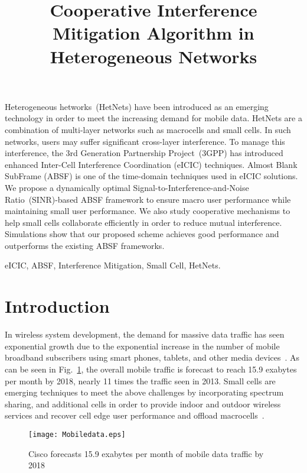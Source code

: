 \documentclass[paper]{ieice}
\title{Cooperative Interference Mitigation Algorithm in Heterogeneous Networks}
\begin{document}
\maketitle
\begin{summary}
Heterogeneous hetworks~(HetNets) have been introduced as an emerging technology in order to meet the increasing demand for mobile data. HetNets are a combination of multi-layer networks such as macrocells and small cells. In such networks, users may suffer significant cross-layer interference. To manage this interference, the 3rd Generation Partnership Project~(3GPP) has introduced enhanced Inter-Cell Interference Coordination (eICIC) techniques. Almost Blank SubFrame (ABSF) is one of the time-domain techniques used in eICIC solutions. We propose a dynamically optimal Signal-to-Interference-and-Noise Ratio~(SINR)-based ABSF framework to ensure macro user performance while maintaining small user performance. We also study cooperative mechanisms to help small cells collaborate efficiently in order to reduce mutual interference. Simulations show that our proposed scheme achieves good performance and outperforms the existing ABSF frameworks.
\end{summary}
\begin{keywords}
eICIC, ABSF, Interference Mitigation, Small Cell, HetNets.
\end{keywords}

\section{Introduction}
\label{Intro}
In wireless system development, the demand for massive data traffic has seen exponential growth due to the exponential increase in the number of mobile broadband subscribers using smart phones, tablets, and other media devices~\cite{Cisco2013}. As can be seen in Fig.~\ref{lb-MobileData}, the overall mobile traffic is forecast to reach 15.9 exabytes per month by 2018, nearly 11 times the traffic seen in 2013. Small cells are emerging techniques to meet the above challenges by incorporating spectrum sharing, and additional cells in order to provide indoor and outdoor wireless services and recover cell edge user performance and offload macrocells~\cite{D2011survey}.
\begin{figure}[ht]
  \centering
\texttt{[image: Mobiledata.eps]}\\
  \caption{Cisco forecasts 15.9 exabytes per month of mobile data traffic by 2018~\cite{Cisco2013}}\label{lb-MobileData}
\end{figure}
\end{document}
